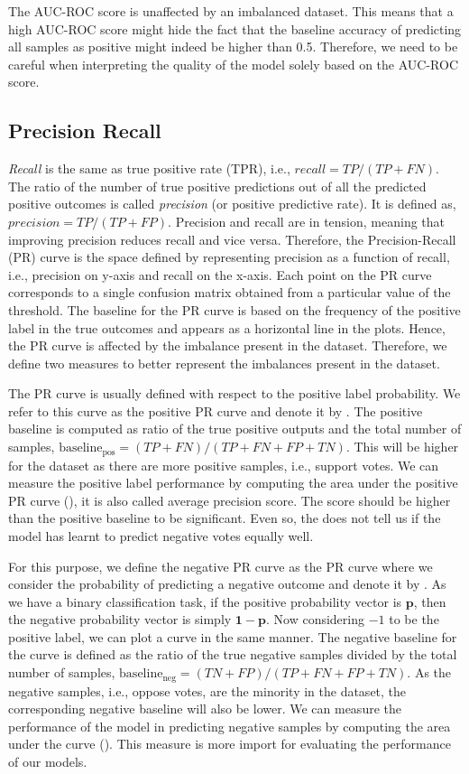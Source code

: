 The AUC-ROC score is unaffected by an imbalanced dataset. 
This means that a high AUC-ROC score might hide the fact that the baseline accuracy of predicting all samples as positive might indeed be higher than 0.5.
Therefore, we need to be careful when interpreting the quality of the model solely based on the AUC-ROC score.

\subsection{Precision Recall}
\textit{Recall} is the same as true positive rate (TPR), i.e., $recall = TP/(TP+FN)$.
The ratio of the number of true positive predictions out of all the predicted positive outcomes is called \textit{precision} (or positive predictive rate).
It is defined as, $precision = TP/(TP+FP)$. 
Precision and recall are in tension, meaning that improving precision reduces recall and vice versa.
Therefore, the Precision-Recall (PR) curve is the space defined by representing precision as a function of recall, i.e., precision on y-axis and recall on the x-axis.
Each point on the PR curve corresponds to a single confusion matrix obtained from a particular value of the threshold.
The baseline for the PR curve is based on the frequency of the positive label in the true outcomes and appears as a horizontal line in the plots.
Hence, the PR curve is affected by the imbalance present in the dataset.
Therefore, we define two measures to better represent the imbalances present in the \wikirfa dataset.

The PR curve is usually defined with respect to the positive label probability.
We refer to this curve as the positive PR curve and denote it by \posPR.
The positive baseline is computed as ratio of the true positive outputs and the total number of samples, $\text{baseline}_{\text{pos}} = (TP+FN)/(TP+FN+FP+TN)$.
This will be higher for the \wikirfa dataset as there are more positive samples, i.e., support votes.
We can measure the positive label performance by computing the area under the positive PR curve (\aucposPR), it is also called average precision score.
The \aucposPR score should be higher than the positive baseline to be significant.
Even so, the \aucposPR does not tell us if the model has learnt to predict negative votes equally well.

For this purpose, we define the negative PR curve as the PR curve where we consider the probability of predicting a negative outcome and denote it by \negPR.
As we have a binary classification task, if the positive probability vector is $\mathbf{p}$, then the negative probability vector is simply $\mathbf{1}-\mathbf{p}$.
Now considering $-1$ to be the positive label, we can plot a \negPR curve in the same manner.
The negative baseline for the \negPR curve is defined as the ratio of the true negative samples divided by the total number of samples, $\text{baseline}_{\text{neg}} = (TN+FP)/(TP+FN+FP+TN)$.
As the negative samples, i.e., oppose votes, are the minority in the \wikirfa dataset, the corresponding negative baseline will also be lower.
We can measure the performance of the model in predicting negative samples by computing the area under the \negPR curve (\aucnegPR).
This measure is more import for evaluating the performance of our models.

